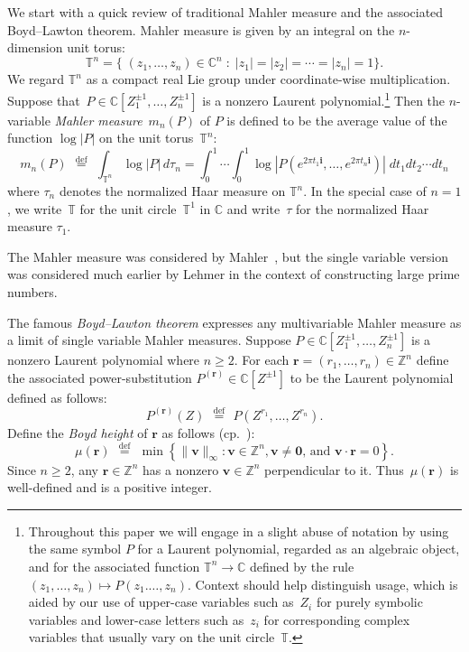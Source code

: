 \documentclass[12pt]{amsart}
\theoremstyle{plain}
\theoremstyle{definition}
\theoremstyle{remark}
\numberwithin{theorem}{section}
\numberwithin{equation}{section} %
\newcommand{\defeq}{\stackrel{\mathrm{def}}{\, = \,}}
\newcommand{\bZ}{{\mathbb{Z}}}
\newcommand{\bC}{{\mathbb{C}}}
\newcommand{\mb}{\mathbf}
\newcommand{\torus}{{\mathbb{T}}}
\begin{document}
We start with a quick review of traditional Mahler measure and
the associated Boyd--Lawton theorem.
Mahler measure is given by an integral on the $n$-dimension unit torus:
$$
\torus^n = \{\; (z_1, \ldots, z_n) \in \bC^n \; \colon 
	 \; |z_1| =|z_2| =  \cdots = |z_n| = 1 \}.
$$
We regard $\torus^n$ as a compact real Lie group under coordinate-wise multiplication.
Suppose that~$P \in \bC\left[Z^{\pm 1}_1, \ldots, Z^{\pm 1}_n\right]$ is a nonzero Laurent polynomial.\footnote{Throughout this paper we will engage in a slight abuse of
notation by using the same symbol $P$ for a Laurent polynomial, regarded as an algebraic object, and for the 
associated function $\torus^n \to \bC$ defined by
the rule~$
(z_1, \ldots, z_n) \mapsto P(z_1. \ldots, z_n)$.  
Context should help distinguish usage, which is aided by our use
of  upper-case variables such as~$Z_i$ for  purely symbolic variables and lower-case letters such as~$z_i$ for corresponding complex variables that usually vary on the unit circle~$\torus$.}
Then 
the $n$-variable \emph{Mahler measure}~$m_n(P)$ of $P$ is defined to be the average
value of the function $\log |P|$ on the unit torus~$\torus^n$:
$$
m_n(P) \; \defeq \; \int_{\torus^n} \log |P| \, d\tau_n  = \int_{0}^{1} \cdots \int_{0}^{1}  \log
\left| P\left(e^{2\pi t_1 \mb i}, \ldots, e^{2\pi t_n \mb i }\right) \right|
\;  d t_1 d t_2 \cdots d t_n
$$
where
$\tau_n$ denotes the normalized Haar measure on $\torus^n$.
In the special case of $n=1$, we write~$\torus$ for the unit circle~$\torus^1$ in $\bC$
and write~$\tau$ for the normalized Haar measure $\tau_1$.

The Mahler measure was considered by Mahler~\cite{Mahler}, but the single variable version was considered
much earlier by Lehmer \cite{Lehmer} in the context of constructing large prime numbers.


The famous \emph{Boyd--Lawton theorem} expresses any multivariable
Mahler measure as a limit of single variable Mahler measures.  
Suppose $P \in \bC\left[Z_1^{\pm 1}, \ldots, Z^{\pm 1}_n\right]$ is a nonzero Laurent polynomial where $n \ge 2$.
For each $\mb r = (r_1, \ldots, r_n) \in \bZ^n$
define the associated power-substitution $P^{(\mb r)} \in \bC\left[Z^{\pm 1}\right]$ to be the Laurent polynomial defined as follows:
$$
P^{(\mb r)} (Z) \; \defeq \;  P\left( Z^{r_1}, \ldots, Z^{r_n} \right).
$$
Define the \emph{Boyd height} of ${\mb r}$ as follows (cp.~\citep[p.~118]{boyd1981}):
$$
\mu\left( \mb r \right) 
\; \defeq \;  
\min 
\left\{ \| \mb v\|_\infty  \colon
    \text{$\mb v \in \bZ^n, \mb v \ne {\mb 0}$, and $\mb v \cdot \mb r = 0$} 
 \right\}.
 $$
 Since $n \ge 2$, any $\mb r \in \bZ^n$ has a nonzero $\mb v \in \bZ^n$ perpendicular to it. 
 Thus~$\mu\left({\mb r}\right)$ is well-defined
and is  a positive integer.
 
\end{document}
